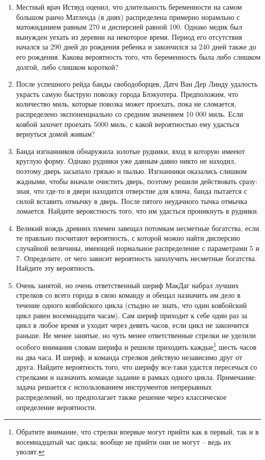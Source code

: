 \documentclass[11pt, a4paper]{article}
\theoremstyle{definition}
\begin{document}
\begin{enumerate}
\begin{enumerate}
    \item Местный врач Иствуд оценил, что длительность беременности на самом большом ранчо Матленда (в днях) распределена примерно норамльно с матожиданием равным 270 и дисперсией равной 100. Однако медик был вынужден уехать из деревни на некоторое время. Период его отсутствия начался за 290 дней до рождения ребенка и закончился за 240 дней также до его рождения. Какова вероятность того, что беременность была либо слишком долгой, либо слишком короткой?
    \item После успешного рейда банды свободоборцев, Датч Ван Дер Линду удалость украсть самую быструю повозку города Блэкуотера. Предположим, что количество миль, которые повозка может проехать, пока не сломается, распределено экспоненциально со средним значением 10 000 миль. Если ковбой захочет проехать 5000 миль, с какой вероятностью ему удасться вернуться домой живым?
    \item Банда изгнанников обнаружила золотые рудники, вход в которую имееют круглую форму. Однако рудники уже давным-давно никто не находил, поэтому дверь засыпало грязью и пылью. Изгнанники оказались слишком жадными, чтобы вначале очистить дверь, поэтому решили действовать сразу: зная, что где-то в двери находится отверстие для ключа, банда пытается с силой вставить отмычку в дверь. После пятого неудачного тычка отмычка ломается. Найдите вероястность того, что им удасться проникнуть в рудники.
    \item Великий вождь древних племен завещал потомкам несметные богатства, если те правльно посчитают вероятность, с которой можно найти дисперсию случайной величины, имеющей нормальное распределение с параметрами 5 и 7. Определите, от чего зависит вероятность заполучить несметные богатства. Найдите эту вероятность.
    \item Очень занятой, но очень ответственный шериф МакДаг набрал лучших стрелков со всего города в свою команду и обещал назначить им дело в течение одного ковбойского цикла (стыдно не знать, что один ковбойский цикл равен восемнадцати часам). 
    Сам шериф приходит к себе один раз за цикл в любое время и уходит через девять часов, если цикл не закончится раньше.
    Не менее занятые, но чуть менее ответственные стрелки не уделили особого внимания словам шерифа и решили приходить каждые\footnote{Обратите внимание, что стрелки впервые могут прийти как в первый, так и в восемнадцатый час цикла; вообще не прийти они не могут – ведь их уволят.} шесть часов на два часа.
    И шериф, и команда стрелков действую независимо друг от друга.
    Найдите вероятность того, что шерифу все-таки удастся пересечься со стрелками и назначить команде задание в рамках одного цикла.
    Примечание: задача решается с использованием инструментов непрерывных распределений, но предполагает также решение через классическое определение вероятности.
\end{enumerate}    
    

\end{enumerate}
\end{document}
